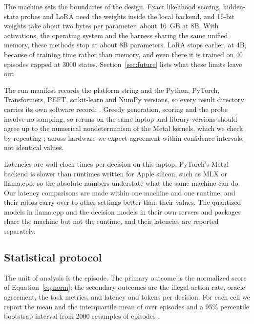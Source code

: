 The machine sets the boundaries of the design. Exact likelihood scoring, hidden-state probes and LoRA need the weights inside the local backend, and 16-bit weights take about two bytes per parameter, about 16~GB at 8B. With activations, the operating system and the harness sharing the same unified memory, these methods stop at about 8B parameters. LoRA stops earlier, at 4B, because of training time rather than memory, and even there it is trained on 40 episodes capped at 3000 states. Section~\ref{sec:future} lists what these limits leave out.

The run manifest records the platform string and the Python, PyTorch, Transformers, PEFT, scikit-learn and NumPy versions, so every result directory carries its own software record: . Greedy generation, scoring and the probe involve no sampling, so reruns on the same laptop and library versions should agree up to the numerical nondeterminism of the Metal kernels, which we check by repeating ; across hardware we expect agreement within confidence intervals, not identical values.

Latencies are wall-clock times per decision on this laptop. PyTorch's Metal backend is slower than runtimes written for Apple silicon, such as MLX or llama.cpp, so the absolute numbers understate what the same machine can do. Our latency comparisons are made within one machine and one runtime, and their ratios carry over to other settings better than their values. The quantized models in llama.cpp and the decision models in their own servers and packages share the machine but not the runtime, and their latencies are reported separately.

\subsection{Statistical protocol}
\label{sec:setup:stats}

The unit of analysis is the episode. The primary outcome is the normalized score \norm{} of Equation~\eqref{eq:norm}; the secondary outcomes are the illegal-action rate, oracle agreement, the task metrics, and latency and tokens per decision. For each cell we report the mean and the interquartile mean of \norm{} over episodes and a 95\% percentile bootstrap interval from 2000 resamples of episodes \citep{efron1993bootstrap,agarwal2021precipice}.

